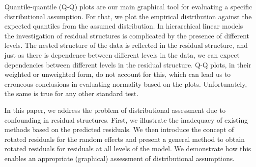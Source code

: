 \documentclass[12pt]{article} %
\newcommand{\hh}[1]{{\color{orange} #1}}
\newcommand{\al}[1]{{\color{red} #1}}
\begin{document}
Quantile-quantile (Q-Q) plots \citep{Wilk:1968} are our main graphical tool for evaluating a specific distributional assumption. For that, we plot the empirical distribution against the expected quantiles from the assumed distribution. In hierarchical linear models the investigation of residual structures is complicated by the presence of  different levels. 
The nested structure of the data is reflected in the residual structure, and just as there is dependence between different levels in the data, we can expect dependencies between different levels in the residual structure. Q-Q plots, {in their} weighted \citep{Dempster:1985tr, Lange:1989uu} or unweighted {form}, do not account for this, which can lead us to erroneous conclusions in evaluating normality based on the plots. \hh{Unfortunately, the same is true for any other standard test. } %



In this paper, we address the problem of distributional assessment due to confounding in residual structures. 
First, we illustrate the inadequacy of existing methods  based on the predicted residuals. 
We then introduce  the concept of \al{rotated} residuals for the random effects and present a general method to obtain \al{rotated} residuals for residuals at all levels of the model. We demonstrate how this enables an appropriate (graphical) assessment  of distributional assumptions.
\end{document}
